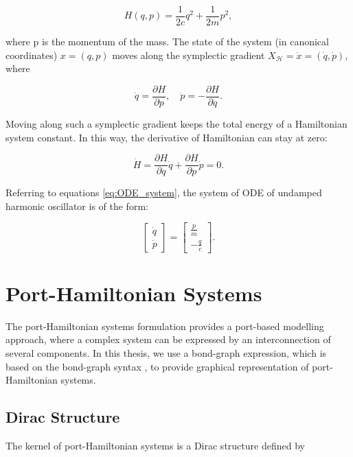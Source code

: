 \documentclass[
	parskip, 			   %
	twoside, 			   %
	DIV=14, 			   %
	BCOR=15.0mm, 		   %
	headsepline, 		   %
	open=right, 		   %
	captions=tableheading, %
	bibliography=totoc,    %
	numbers=noenddot       %
]{scrreprt}
\begin{document}
\begin{equation}
    \label{eq:Hamiltonian_udho}
    H(q,p)=\frac{1}{2c}q^2+\frac{1}{2m}p^2,
\end{equation}

where p is the momentum of the mass. The state of the system (in canonical coordinates) $x=(q,p)$ moves along the symplectic gradient $X_{\mathcal{H}} = \dot{x}=(\dot{q},\dot{p})$, where

\begin{equation}
    \label{eq:symplectic_gradient}
    \dot{q}=\frac{\partial H}{\partial p}, \quad \dot{p}=-\frac{\partial H}{\partial q}.
\end{equation}

Moving along such a symplectic gradient keeps the total energy of a Hamiltonian system constant. In this way, the derivative of Hamiltonian can stay at zero:

\begin{equation}
    \label{eq:derivative_Hamiltonian}
    \dot{H}=\frac{\partial H}{\partial q}\dot{q}+\frac{\partial H}{\partial p}\dot{p}=0.
\end{equation}

Referring to equations \ref{eq:ODE_system}, the system of ODE of undamped harmonic oscillator is of the form:

\begin{equation}
    \label{eq:ODE_undamped_harmonic_oscillator}
    \begin{bmatrix}
    \dot{q}\\
    \dot{p}
    \end{bmatrix}
    =
    \begin{bmatrix}
    \frac{p}{m}\\
    -\frac{q}{c}
    \end{bmatrix}.
\end{equation}

\section{Port-Hamiltonian Systems}
The port-Hamiltonian systems formulation provides a port-based modelling approach, where a complex system can be expressed by an interconnection of several components. In this thesis, we use a bond-graph expression, which is based on the bond-graph syntax \cite{paynter1961analysis}, to provide graphical representation of port-Hamiltonian systems.

\subsection{Dirac Structure}
The kernel of port-Hamiltonian systems is a Dirac structure defined by
\end{document}
